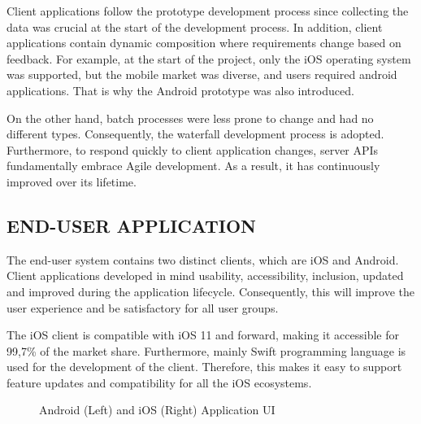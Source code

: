 Client applications follow the prototype development process since collecting the data was crucial at the start of the development process. In addition, client applications contain dynamic composition where requirements change based on feedback. For example, at the start of the project, only the iOS operating system was supported, but the mobile market was diverse, and users required android applications. That is why the Android prototype was also introduced.

On the other hand, batch processes were less prone to change and had no different types. Consequently, the waterfall development process is adopted. Furthermore, to respond quickly to client application changes, server APIs fundamentally embrace Agile development. As a result, it has continuously improved over its lifetime. 

\subsection{END-USER APPLICATION}

The end-user system contains two distinct clients, which are iOS and Android. Client applications developed in mind usability, accessibility, inclusion, updated and improved during the application lifecycle. Consequently, this will improve the user experience and be satisfactory for all user groups.

The iOS client is compatible with iOS 11 and forward, making it accessible for 99,7\% of the market share. Furthermore, mainly Swift programming language is used for the development of the client. Therefore, this makes it easy to support feature updates and compatibility for all the iOS ecosystems. 

\begin{figure}[htbp]
\centering
{}
\caption{Android (Left) and iOS (Right) Application UI}
\label{fig:UserApplicationUI}
\end{figure}

